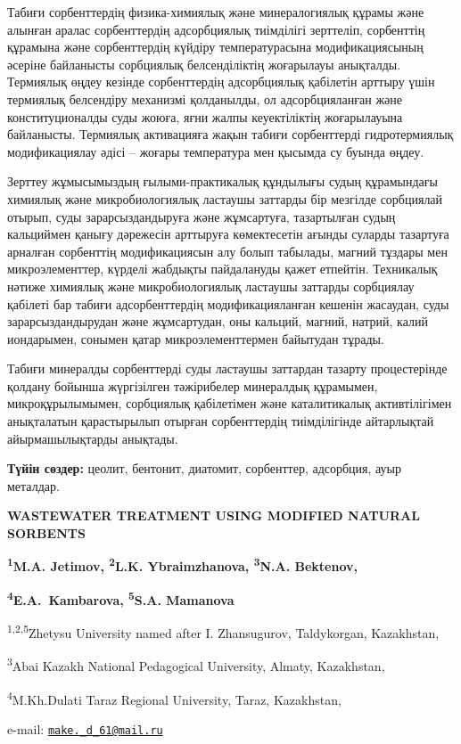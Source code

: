 Табиғи сорбенттердің физика-химиялық және минералогиялық құрамы және
алынған аралас сорбенттердің адсорбциялық тиімділігі зерттеліп,
сорбенттің құрамына және сорбенттердің күйдіру температурасына
модификациясының әсеріне байланысты сорбциялық белсенділіктің жоғарылауы
анықталды. Термиялық өңдеу кезінде сорбенттердің адсорбциялық қабілетін
арттыру үшін термиялық белсендіру механизмі қолданылды, ол
адсорбцияланған және конституционалды суды жоюға, яғни жалпы
кеуектіліктің жоғарылауына байланысты. Термиялық активацияға жақын
табиғи сорбенттерді гидротермиялық модификациялау әдісі -- жоғары
температура мен қысымда су буында өңдеу.

Зерттеу жұмысымыздың ғылыми-практикалық құндылығы судың құрамындағы
химиялық және микробиологиялық ластаушы заттарды бір мезгілде сорбциялай
отырып, суды зарарсыздандыруға және жұмсартуға, тазартылған судың
кальциймен қанығу дәрежесін арттыруға көмектесетін ағынды суларды
тазартуға арналған сорбенттің модификациясын алу болып табылады, магний
тұздары мен микроэлементтер, күрделі жабдықты пайдалануды қажет
етпейтін. Техникалық нәтиже химиялық және микробиологиялық ластаушы
заттарды сорбциялау қабілеті бар табиғи адсорбенттердің
модификацияланған кешенін жасаудан, суды зарарсыздандырудан және
жұмсартудан, оны кальций, магний, натрий, калий иондарымен, сонымен
қатар микроэлементтермен байытудан тұрады.

Табиғи минералды сорбенттерді суды ластаушы заттардан тазарту
процестерінде қолдану бойынша жүргізілген тәжірибелер минералдық
құрамымен, микроқұрылымымен, сорбциялық қабілетімен және каталитикалық
активтілігімен анықталатын қарастырылып отырған сорбенттердің
тиімділігінде айтарлықтай айырмашылықтарды анықтады.

{\bfseries Түйін сөздер:} цеолит, бентонит, диатомит, сорбенттер,
адсорбция, ауыр металдар.

\begin{articleheader}
{\bfseries WASTEWATER TREATMENT USING MODIFIED NATURAL SORBENTS}

{\bfseries \textsuperscript{1}M.A. Jetimov\textsuperscript{\envelope },
\textsuperscript{2}L.K. Ybraimzhanova, \textsuperscript{3}N.A.
Bektenov,}

{\bfseries \textsuperscript{4}E.A.~Kambarova, \textsuperscript{5}S.A.
Mamanova}
\end{articleheader}

\begin{affiliation}
\textsuperscript{1,2,5}Zhetysu University named after I. Zhansugurov,
Taldykorgan, Kazakhstan,

\textsuperscript{3}Abai Kazakh National Pedagogical University, Almaty,
Kazakhstan,

\textsuperscript{4}M.Kh.Dulati Taraz Regional University, Taraz,
Kazakhstan,

e-mail: \href{mailto:make._d_61@mail.ru}{\nolinkurl{make.\_d\_61@mail.ru}}
\end{affiliation}

